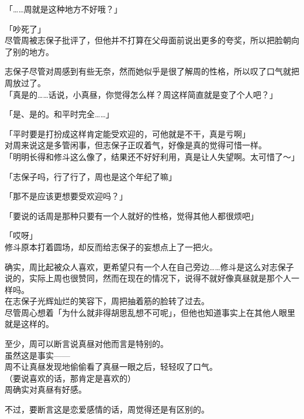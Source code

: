 「……周就是这种地方不好哦？」

「吵死了」\\

尽管周被志保子批评了，但他并不打算在父母面前说出更多的夸奖，所以把脸朝向了别的地方。

志保子尽管对周感到有些无奈，然而她似乎是很了解周的性格，所以叹了口气就把周放过了。\\

「真是的……话说，小真昼，你觉得怎么样？周这样简直就是变了个人吧？」

「是、是的。和平时完全……」

「平时要是打扮成这样肯定能受欢迎的，可他就是不干，真是亏啊」\\

对周来说这是多管闲事，但志保子正叹着气，好像是真的觉得可惜一样。\\

「明明长得和修斗这么像了，结果还不好好利用，真是让人失望啊。太可惜了～」

「志保子吗，行了行了，周也是这个年纪了嘛」

「那不是应该更想要受欢迎吗？」

「要说的话周是那种只要有一个人就好的性格，觉得其他人都很烦吧」

「哎呀」\\

修斗原本打着圆场，却反而给志保子的妄想点上了一把火。

确实，周比起被众人喜欢，更希望只有一个人在自己旁边……修斗是这么对志保子说的，实际上周也很赞同，然而在现在的情况下，说得不就好像真昼就是那个人一样吗。\\

在志保子光辉灿烂的笑容下，周把抽着筋的脸转了过去。\\

尽管周心想着「为什么就非得胡思乱想不可呢」，但他也知道事实上在其他人眼里就是这样的。

至少，周可以断言说真昼对他而言是特别的。\\

虽然这是事实——\\

周不让真昼发现地偷偷看了真昼一眼之后，轻轻叹了口气。\\

（要说喜欢的话，那肯定是喜欢的）\\

周确实对真昼有好感。

不过，要断言这是恋爱感情的话，周觉得还是有区别的。\\

